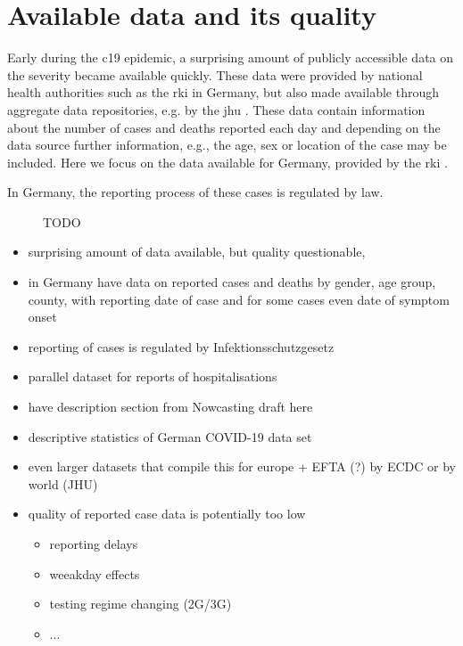 \section{Available data and its quality}
\label{sec:data}

Early during the \acrshort{c19} epidemic, a surprising amount of publicly accessible data on the severity became available quickly. These data were provided by national health authorities such as the \acrfull{rki} in Germany, but also made available through aggregate data repositories, e.g. by the \acrfull{jhu} \citep{Dong2020Interactive}. These data contain information about the number of cases and deaths reported each day and depending on the data source further information, e.g., the age, sex or location of the case may be included. Here we focus on the data available for Germany, provided by the \acrshort{rki} \citep{RobertKoch-Institut2022SARSCoV2}. 

In Germany, the reporting process of these cases is regulated by law. 



\begin{figure}
    \resizebox{\textwidth}{!}{%
    }
    \caption{TODO}
    \label{fig:cases_germany}
\end{figure}

\begin{itemize}
    \item surprising amount of data available, but quality questionable, 
    \item in Germany have data on reported cases and deaths by gender, age group, county, with reporting date of case and for some cases even date of symptom onset
    \item reporting of cases is regulated by Infektionsschutzgesetz
    \item parallel dataset for reports of hospitalisations 
    \item have description section from Nowcasting draft here
    \item descriptive statistics of German COVID-19 data set
    \item even larger datasets that compile this for europe + EFTA (?) by ECDC or by world (JHU)
    \item quality of reported case data is potentially too low 
    \begin{itemize}
        \item reporting delays
        \item weeakday effects
        \item testing regime changing (2G/3G)
        \item ...
    \end{itemize}
\end{itemize}